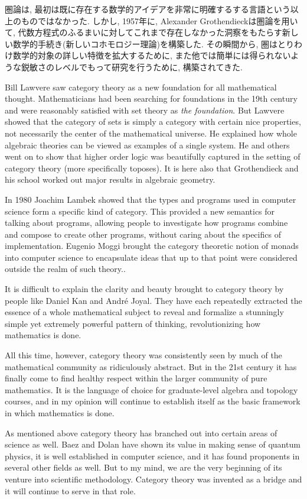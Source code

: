圏論は, 最初は既に存在する数学的アイデアを非常に明確するする言語という以上のものではなかった. しかし, 1957年に, Alexander Grothendieckは圏論を用いて, 代数方程式のふるまいに対してこれまで存在しなかった洞察をもたらす新しい数学的手続き(新しいコホモロジー理論)を構築した. その瞬間から, 圏はとりわけ数学的対象の詳しい特徴を拡大するために, また他では簡単には得られないような鋭敏さのレベルでもって研究を行うために, 構築されてきた.

Bill Lawvere saw category theory as a new foundation for all mathematical thought. Mathematicians had been searching for foundations in the 19th century and were reasonably satisfied with set theory as {\em the foundation}. But Lawvere showed that the category of sets is simply a category with certain nice properties, not necessarily the center of the mathematical universe. He explained how whole algebraic theories can be viewed as examples of a single system. He and others went on to show that higher order logic was beautifully captured in the setting of category theory (more specifically toposes). It is here also that Grothendieck and his school worked out major results in algebraic geometry. 

In 1980 Joachim Lambek showed that the types and programs used in computer science form a specific kind of category. This provided a new semantics for talking about programs, allowing people to investigate how programs combine and compose to create other programs, without caring about the specifics of implementation. Eugenio Moggi brought the category theoretic notion of monads into computer science to encapsulate ideas that up to that point were considered outside the realm of such theory..

It is difficult to explain the clarity and beauty brought to category theory by people like Daniel Kan and Andr\'{e} Joyal. They have each repeatedly extracted the essence of a whole mathematical subject to reveal and formalize a stunningly simple yet extremely powerful pattern of thinking, revolutionizing how mathematics is done. 

All this time, however, category theory was consistently seen by much of the mathematical community as ridiculously abstract. But in the 21st century it has finally come to find healthy respect within the larger community of pure mathematics. It is the language of choice for graduate-level algebra and topology courses, and in my opinion will continue to establish itself as the basic framework in which mathematics is done.

As mentioned above category theory has branched out into certain areas of science as well. Baez and Dolan have shown its value in making sense of quantum physics, it is well established in computer science, and it has found proponents in several other fields as well. But to my mind, we are the very beginning of its venture into scientific methodology. Category theory was invented as a bridge and it will continue to serve in that role. 



